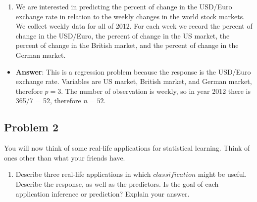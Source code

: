 \documentclass[
]{article}
\providecommand{\tightlist}{%
  \setlength{\itemsep}{0pt}\setlength{\parskip}{0pt}}
\begin{document}
\begin{enumerate}
\def\labelenumi{(\alph{enumi})}
\setcounter{enumi}{2}
\tightlist
\item
  We are interested in predicting the percent of change in the USD/Euro
  exchange rate in relation to the weekly changes in the world stock
  markets. We collect weekly data for all of 2012. For each week we
  record the percent of change in the USD/Euro, the percent of change in
  the US market, the percent of change in the British market, and the
  percent of change in the German market.
\end{enumerate}

\begin{itemize}
\tightlist
\item
  \textbf{Answer}: This is a regression problem because the response is
  the USD/Euro exchange rate. Variables are US market, British market,
  and German market, therefore \(p = 3\). The number of observation is
  weekly, so in year 2012 there is 365/7 = 52, therefore \(n = 52\).
\end{itemize}

\hypertarget{problem-2}{%
\subsection{Problem 2}\label{problem-2}}

You will now think of some real-life applications for statistical
learning. Think of ones other than what your friends have.

\begin{enumerate}
\def\labelenumi{(\alph{enumi})}
\tightlist
\item
  Describe three real-life applications in which \(classification\)
  might be useful. Describe the response, as well as the predictors. Is
  the goal of each application inference or prediction? Explain your
  answer.
\end{enumerate}
\end{document}
